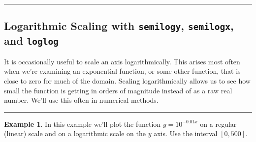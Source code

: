 \documentclass[
]{book}
\theoremstyle{definition}
\theoremstyle{definition}
\newtheorem{example}{Example}[chapter]
\theoremstyle{definition}
\theoremstyle{remark}
\begin{document}
\begin{center}\rule{0.5\linewidth}{0.5pt}\end{center}

\hypertarget{logarithmic-scaling-with-semilogy-semilogx-and-loglog}{%
\subsection{\texorpdfstring{Logarithmic Scaling with \texttt{semilogy}, \texttt{semilogx}, and \texttt{loglog}}{Logarithmic Scaling with semilogy, semilogx, and loglog}}\label{logarithmic-scaling-with-semilogy-semilogx-and-loglog}}

It is occasionally useful to scale an axis logarithmically. This arises most often when we're examining an exponential function, or some other function, that is close to zero for much of the domain. Scaling logarithmically allows us to see how small the function is getting in orders of magnitude instead of as a raw real number. We'll use this often in numerical methods.

\begin{center}\rule{0.5\linewidth}{0.5pt}\end{center}

\begin{example}
\protect\hypertarget{exm:unnamed-chunk-766}{}{\label{exm:unnamed-chunk-766} }In this example we'll plot the function \(y = 10^{-0.01x}\) on a regular (linear) scale and on a logarithmic scale on the \(y\) axis. Use the interval \([0,500]\).
\end{example}
\end{document}
